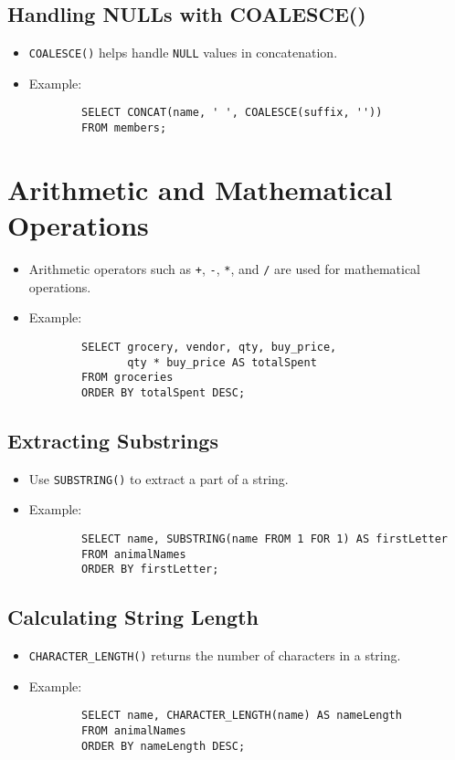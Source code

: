 \documentclass{article}
\begin{document}
\subsection{Handling NULLs with COALESCE()}
\begin{itemize}
    \item \texttt{COALESCE()} helps handle \texttt{NULL} values in concatenation.
    \item Example:
    \begin{verbatim}
        SELECT CONCAT(name, ' ', COALESCE(suffix, ''))
        FROM members;
    \end{verbatim}
\end{itemize}

\newpage

\section{Arithmetic and Mathematical Operations}
\begin{itemize}
    \item Arithmetic operators such as \texttt{+}, \texttt{-}, \texttt{*}, and \texttt{/} are used for mathematical operations.
    \item Example:
    \begin{verbatim}
        SELECT grocery, vendor, qty, buy_price, 
               qty * buy_price AS totalSpent
        FROM groceries
        ORDER BY totalSpent DESC;
    \end{verbatim}
\end{itemize}

\subsection{Extracting Substrings}
\begin{itemize}
    \item Use \texttt{SUBSTRING()} to extract a part of a string.
    \item Example:
    \begin{verbatim}
        SELECT name, SUBSTRING(name FROM 1 FOR 1) AS firstLetter
        FROM animalNames
        ORDER BY firstLetter;
    \end{verbatim}
\end{itemize}

\subsection{Calculating String Length}
\begin{itemize}
    \item \texttt{CHARACTER\_LENGTH()} returns the number of characters in a string.
    \item Example:
    \begin{verbatim}
        SELECT name, CHARACTER_LENGTH(name) AS nameLength
        FROM animalNames
        ORDER BY nameLength DESC;
    \end{verbatim}
\end{itemize}
\end{document}
